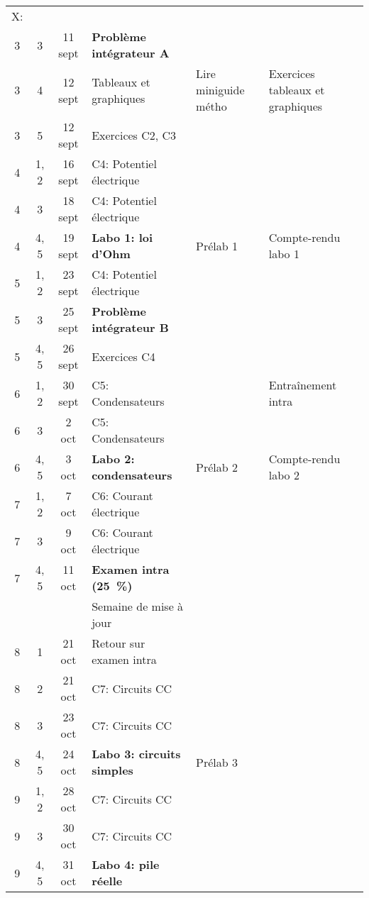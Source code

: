 \documentclass[10pt]{article}
\begin{document}
\begin{longtable}{cccp{6cm}lp{9cm}}
       X:  \\
  3     &  3     &  11 sept  &  \textbf{Problème intégrateur A}  \\
  3     &  4     &  12 sept   &  Tableaux et graphiques
    & Lire miniguide métho
    & Exercices tableaux et graphiques  \\
  3     &  5     &  12 sept   &  Exercices C2, C3  \\
  \midrule
  4     &  1, 2  &  16 sept   &  C4: Potentiel électrique  \\
  4     &  3     &  18 sept   &  C4: Potentiel électrique  \\
  4     &  4, 5  &  19 sept   &  \textbf{Labo 1: loi d'Ohm}
    &  Prélab 1  &  Compte-rendu labo 1 \\
  \midrule
  5     &  1, 2  &  23 sept  &  C4: Potentiel électrique  \\
  5     &  3     &  25 sept  &  \textbf{Problème intégrateur B}  \\
  5     &  4, 5  &  26 sept  &  Exercices C4
    &    &   \\
  \midrule
  6     &  1, 2  &  30 sept  &  C5: Condensateurs
    &  &  Entraînement intra  \\
  6     &  3     &  2 oct    &  C5: Condensateurs  \\
  6     &  4, 5  &  3 oct    &  \textbf{Labo 2: condensateurs}
    &  Prélab 2  &  Compte-rendu labo 2 \\
  \midrule
  7     &  1, 2  &  7 oct    &  C6: Courant électrique  \\
  7     &  3     &  9 oct    &  C6: Courant électrique  \\
  7     &  4, 5  &  11 oct   &  \textbf{Examen intra (\qty{25}{\percent})}
    &    &   \\
  \midrule
        &        &           &  Semaine de mise à jour  \\
  \midrule
  8     &  1     &  21 oct   &  Retour sur examen intra  \\
  8     &  2     &  21 oct   &  C7: Circuits CC  \\
  8     &  3     &  23 oct   &  C7: Circuits CC  &   &   \\
  8     &  4, 5  &  24 oct   &  \textbf{Labo 3: circuits simples}
    &  Prélab 3  &   \\
  \midrule
  9     &  1, 2  &  28 oct   &  C7: Circuits CC  \\
  9     &  3     &  30 oct   &  C7: Circuits CC  \\
  9     &  4, 5  &  31 oct   &  \textbf{Labo 4: pile réelle}

\end{longtable}
\end{document}
